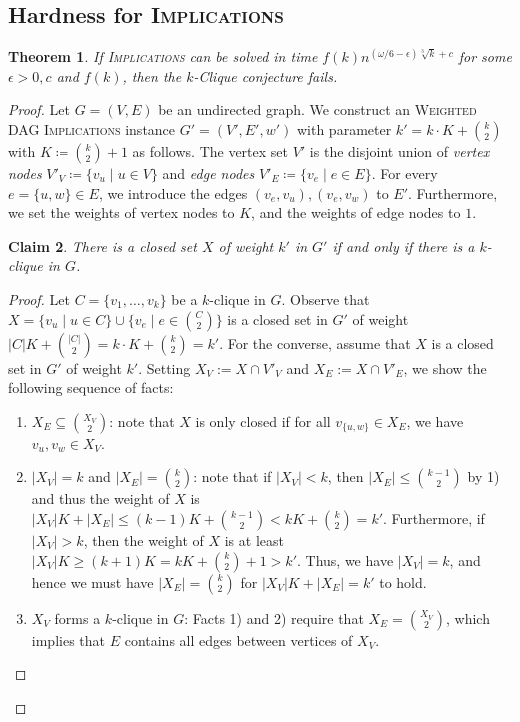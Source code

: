 \documentclass[10pt,a4paper]{article}
\theoremstyle{plain}
\newtheorem{thm}{Theorem}[section]
\newtheorem{claim}[thm]{Claim}
\newcommand{\Implication}{\textsc{Implications}\xspace}
\newcommand{\wDAGImplication}{\textsc{Weighted DAG Implications}\xspace}
\newcommand{\eps}{\epsilon}
\begin{document}
\subsection{Hardness for \Implication}
%
\begin{thm}\label{thm:implhardness}
If \Implication can be solved in time $f(k) n^{(\omega/6-\eps)\sqrt[3]{k}+c}$ for some $\eps>0, c$ and $f(k)$, then the $k$-Clique conjecture fails.
\end{thm}
\begin{proof}
%
Let $G=(V, E)$ be an undirected graph.
We construct an \wDAGImplication instance $G' = (V', E', w')$ with parameter $k' = k\cdot K + {k \choose 2}$ with $K\coloneqq {k \choose 2}+1$ as follows.
The vertex set $V'$ is the disjoint union of \emph{vertex nodes} $V'_V \coloneqq \{v_u \mid u\in V\}$  and \emph{edge nodes} $V'_E \coloneqq \{v_e \mid e\in E\}$. For every $e=\{u,w\}\in E$, we introduce the edges $(v_e, v_u), (v_e, v_w)$ to $E'$. Furthermore, we set the weights of vertex nodes to $K$, and the weights of edge nodes to $1$. 
%
\begin{claim}
There is a closed set $X$ of weight $k'$ in $G'$ if and only if there is a $k$-clique in $G$.
\end{claim}
\begin{proof}
Let $C=\{v_1, \dots, v_k\}$ be a $k$-clique in $G$. Observe that $X = \{ v_u \mid u\in C\} \cup \{ v_e \mid e\in {C\choose 2}\}$ is a closed set in $G'$ of weight $|C|K + {|C| \choose 2} = k\cdot K + {k \choose 2} = k'$.
%
For the converse, assume that $X$ is a closed set in $G'$ of weight $k'$. Setting $X_V := X\cap V'_V$ and $X_E := X\cap V'_E$, we show the following sequence of facts:
\begin{enumerate}[label=\arabic*)]
\item $X_E \subseteq {X_V \choose 2}$: note that $X$ is only closed if for all $v_{\{u,w\}} \in X_E$, we have $v_u, v_w \in X_V$.
\item $|X_V| = k$ and $|X_E| = {k \choose 2}$: note that if $|X_V|< k$, then $|X_E| \le {k-1 \choose 2}$ by 1) and thus the weight of $X$ is $|X_V|K+|X_E| \le (k-1)K + {k-1 \choose 2} < kK+ {k \choose 2} = k'$. Furthermore, if $|X_V|>k$, then the weight of $X$ is at least $|X_V|K \ge (k+1)K = kK + {k \choose 2} + 1> k'$. Thus, we have $|X_V| = k$, and hence we must have $|X_E| = {k \choose 2}$ for $|X_V|K + |X_E| = k'$ to hold.
%
\item $X_V$ forms a $k$-clique in $G$: Facts 1) and 2) require that $X_E = {X_V \choose 2}$, which implies that $E$ contains all edges between vertices of $X_V$. 

\end{enumerate}
\end{proof}
\end{proof}
\end{document}
